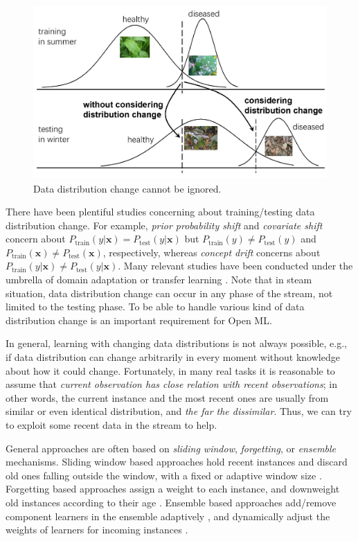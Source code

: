\documentclass[review,11pt]{ReportTemplate}
\begin{document}
\begin{figure}[!ht]
\begin{center}
  \includegraphics[width=0.7\linewidth]{fig4}
  \caption{Data distribution change cannot be ignored.}\label{fig:fig4}
\end{center}
\end{figure}

There have been plentiful studies concerning about training/testing data distribution change. For example, \textit{prior probability shift} and \textit{covariate shift} \cite{Sugiyama:Kawanabe2012} concern about $P_{\text{train}}(y|\bm{x}) = P_{\text{test}}(y|\bm{x})$ but $P_{\text{train}}(y) \neq P_{\text{test}}(y)$ and $P_{\text{train}}(\bm{x}) \neq P_{\text{test}}(\bm{x})$, respectively, whereas \textit{concept drift} \cite{Gama:Zliobaite:Bifet:Pechenizkiy2014} concerns about $P_{\text{train}}(y|\bm{x}) \neq P_{\text{test}}(y|\bm{x})$. Many relevant studies have been conducted under the umbrella of domain adaptation \cite{DaumeIII:Marcu2006,BenDavid:Lu:Luu:Pal2010,Kouw:Loog2021} or transfer learning \cite{Pan:Yang2009}. Note that in steam situation, data distribution change can occur in any phase of the stream, not limited to the testing phase. To be able to handle various kind of data distribution change is an important requirement for Open ML.

In general, learning with changing data distributions is not always possible, e.g., if data distribution can change arbitrarily in every moment without knowledge about how it could change. Fortunately, in many real tasks it is reasonable to assume that \textit{current observation has close relation with recent observations}; in other words, the current instance and the most recent ones are usually from similar or even identical distribution, and \textit{the far the dissimilar}. Thus, we can try to exploit some recent data in the stream to help.

General approaches are often based on \textit{sliding window}, \textit{forgetting}, or \textit{ensemble} mechanisms. Sliding window based approaches hold recent instances and discard old ones falling outside the window, with a fixed or adaptive window size \cite{Klinkenberg:Joachims2000,Kuncheva:Zliobaite2009}. Forgetting based approaches assign a weight to each instance, and downweight old instances according to their age \cite{Koychev2000,Anagnostopoulos:Tasoulis:Adams:Pavlidis2012}. Ensemble \cite{Zhou2012} based approaches add/remove component learners in the ensemble adaptively , and dynamically adjust the weights of learners for incoming instances \cite{Gomes:Barddal:Enembreck2017}.
\end{document}
